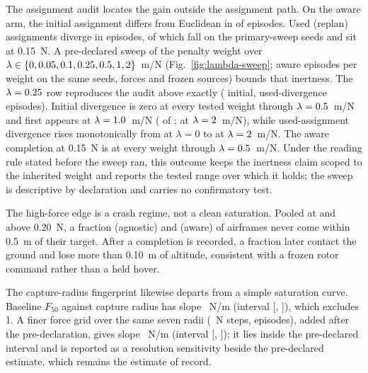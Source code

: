 The assignment audit locates the gain outside the assignment path. On the
aware arm, the initial assignment differs from Euclidean in \AuditInitialDivergence{} of
\AuditAwareEpisodes{} episodes. Used (replan) assignments diverge in
\AuditUsedDivergence{} episodes, of which \AuditUsedDivergencePrimary{}
fall on the primary-sweep seeds and \AuditUsedDivergenceKnee{} sit at
0.15~N. A pre-declared sweep of the penalty weight over
$\lambda\in\{0, 0.05, 0.1, 0.25, 0.5, 1, 2{}\}$~m/N (Fig.~\ref{fig:lambda-sweep};
\LambdaAwareEpisodes{} aware episodes per weight on the same seeds, forces
and frozen sources) bounds that inertness. The $\lambda=0.25{}$ row reproduces
the audit above exactly (\AuditInitialDivergence{} initial,
\LambdaUsedDivAtQuarter{} used-divergence episodes). Initial divergence is
zero at every tested weight through $\lambda=0.5{}$~m/N and first
appears at $\lambda=1.0{}$~m/N (\LambdaInitialDivAtOne{}
of \LambdaAwareEpisodes{}; \LambdaInitialDivAtTwo{} at
$\lambda=2{}$~m/N), while used-assignment divergence rises
monotonically from \LambdaUsedDivAtZero{} at $\lambda=0$ to
\LambdaUsedDivAtTwo{} at $\lambda=2{}$~m/N. The aware
completion at 0.15~N is \LambdaCompletionFlat{} at every weight through
$\lambda=0.5{}$~m/N. Under the reading rule stated before the
sweep ran, this outcome keeps the inertness claim scoped to the inherited
weight and reports the tested range over which it holds; the sweep is
descriptive by declaration and carries no confirmatory test.

The high-force edge is a crash regime, not a clean saturation. Pooled at and
above 0.20~N, a fraction \AuditNeverCloseBase{} (agnostic) and
\AuditNeverCloseAware{} (aware) of airframes never come within 0.5~m of
their target. After a completion is recorded, a fraction
\AuditGroundContactAfter{} later contact the ground and
\AuditAltLossAfter{} lose more than 0.10~m of altitude, consistent with a
frozen rotor command rather than a held hover.

The capture-radius fingerprint likewise departs from a simple saturation
curve. Baseline $F_{50}$ against capture radius has slope
\AuditRadiusSlope{}~N/m (interval [\AuditRadiusSlopeLo{},
\AuditRadiusSlopeHi{}]), which excludes 1. A finer force grid over the same
seven radii (\AFiveBForceStepN{}~N steps, \AFiveBEpisodes{} episodes), added
after the pre-declaration, gives slope \AFiveBSlope{}~N/m (interval
[\AFiveBSlopeLo{}, \AFiveBSlopeHi{}]); it lies inside the pre-declared
interval and is reported as a resolution sensitivity beside the pre-declared
estimate, which remains the estimate of record.

